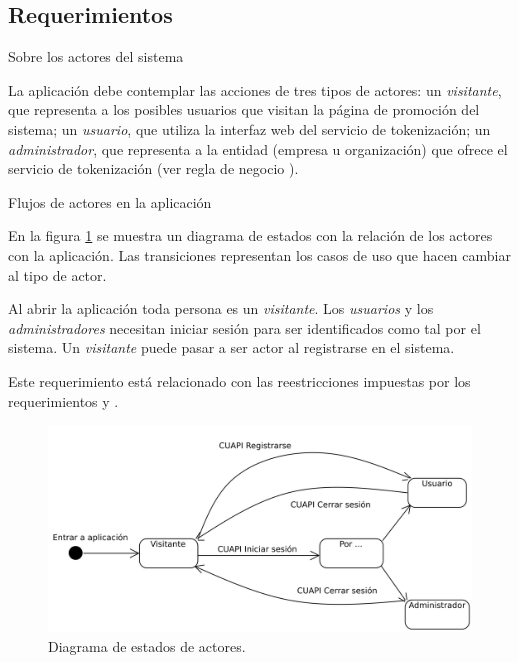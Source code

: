 %
%

\subsection{Requerimientos}


{Sobre los actores del sistema}
{
  La aplicación debe contemplar las acciones de tres tipos de actores: un
  \textit{visitante}, que representa a los posibles usuarios que visitan la
  página de promoción del sistema; un \textit{usuario}, que utiliza la interfaz
  web del servicio de tokenización; un \textit{administrador}, que representa a
  la entidad (empresa u organización) que ofrece el servicio de tokenización
  (ver regla de negocio ).

  {Flujos de actores en la aplicación}
  {
    En la figura \ref{estados_actores} se muestra un diagrama de estados con
    la relación de los actores con la aplicación. Las transiciones representan
    los casos de uso que hacen cambiar al tipo de actor.

    Al abrir la aplicación toda persona es un \textit{visitante}. Los
    \textit{usuarios} y los \textit{administradores} necesitan iniciar sesión
    para ser identificados como tal por el sistema. Un \textit{visitante} puede
    pasar a ser actor al registrarse en el sistema.

    Este requerimiento está relacionado con las reestricciones impuestas por los
    requerimientos  y
    .
  }
}


\begin{figure}
  \begin{center}
    \includegraphics[width=0.8\linewidth]{diagramas/flujo_de_actores.png}
    \caption{Diagrama de estados de actores.}
    \label{estados_actores}
  \end{center}
\end{figure}

